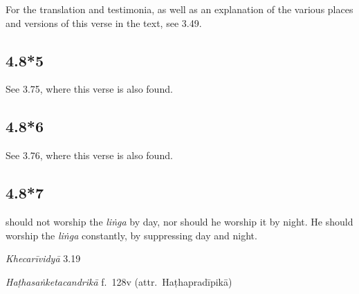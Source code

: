 \begin{ekdosis}
\begin{philcomm}[hp04_008_4]
For the translation and testimonia, as well as an explanation of the various places and versions of this verse in the text, see 3.49.
\end{philcomm}


\subsection*{4.8*5}
\begin{philcomm}[hp04_008_5]
See 3.75, where this verse is also found.
\end{philcomm}

\subsection*{4.8*6}
\begin{philcomm}[hp04_008_6]
See 3.76, where this verse is also found.
\end{philcomm}

\subsection*{4.8*7}
\begin{translation} should not worship the \emph{liṅga} by day, nor should he worship it by night. He should worship the \emph{liṅga} constantly, by suppressing day and night.
\end{translation}

\begin{sources}[hp04_008_7]
\emph{Khecarīvidyā} 3.19
\begin{versinnote}
\end{versinnote}
\end{sources}

\begin{testimonia}[hp04_008_7]
\emph{Haṭhasaṅketacandrikā} f.~128v (attr.~Haṭhapradīpikā)
\begin{versinnote}
\end{versinnote}
\end{testimonia}


\end{ekdosis}
